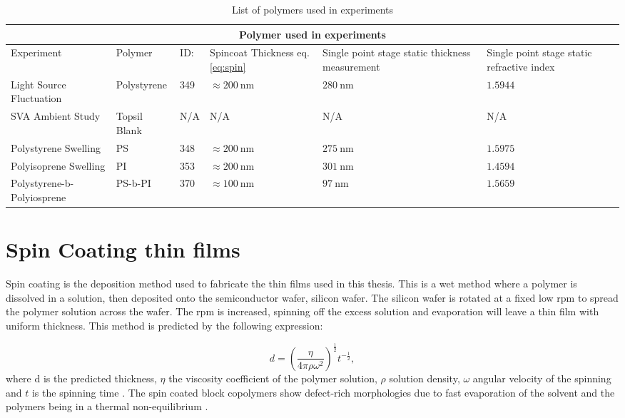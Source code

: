 \documentclass[MasterThesisMain.tex]{subfiles}
\begin{document}
\begin{table}
	\caption{List of polymers used in experiments}
\begin{tabular}{ |p{3cm}||p{2cm}|p{2cm}|p{2cm}|p{2cm}|p{2cm}|  }
 \hline
 \multicolumn{6}{|c|}{Polymer used in experiments} \\
 \hline
 Experiment & Polymer & ID: & Spincoat Thickness eq.\ref{eq:spin} & Single point stage static thickness measurement & Single point stage static refractive index\\
 \hline
 Light Source Fluctuation & Polystyrene & 349 & $\approx\SI{200}{\nano\meter}$ & $\SI{280}{\nano\meter}$ & $1.5944$  \\
 SVA Ambient Study & Topsil Blank & N/A & N/A & N/A & N/A  \\
 Polystyrene Swelling & PS  & 348  & $\approx\SI{200}{\nano\meter}$ & $\SI{275}{\nano\meter}$ & $1.5975$  \\
 Polyisoprene Swelling & PI  & 353 & $\approx\SI{200}{\nano\meter}$ & $\SI{301}{\nano\meter}$ & $1.4594$  \\
 Polystyrene-b-Polyiosprene & PS-b-PI & 370 & $\approx\SI{100}{\nano\meter}$ & $\SI{97}{\nano\meter}$ & $1.5659$ \\  
\hline
\end{tabular}
\label{tab:polymers}
\end{table}

\section{Spin Coating thin films}
Spin coating is the deposition method used to fabricate the thin films used in this thesis. This is a wet method where a polymer is dissolved in a solution, then deposited onto the semiconductor wafer, silicon wafer. The silicon wafer is rotated at a fixed low rpm to spread the polymer solution across the wafer. The rpm is increased, spinning off the excess solution and evaporation will leave a thin film with uniform thickness. This method is predicted by the following expression:

\begin{equation}\label{eq:spin}
d = \left(\frac{\eta}{4\pi\rho\omega^2}\right)^{\frac{1}{2}} t^{-\frac{1}{2}},
\end{equation}  
where d is the predicted thickness, $\eta$ the viscosity coefficient of the polymer solution, $\rho$ solution density, $\omega$ angular velocity of the spinning and $t$ is the spinning time \cite{petty2008molecular}. The spin coated block copolymers show defect-rich morphologies due to fast evaporation of the solvent and the polymers being in a thermal non-equilibrium \cite{PosseltBCP}.
\end{document}
